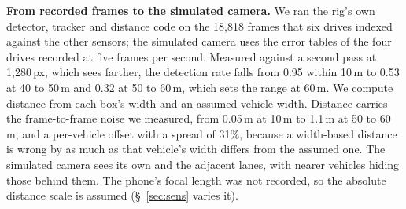 \noindent\textbf{From recorded frames to the simulated camera.} We ran the rig's own detector, tracker and distance code on the 18,818 frames that six drives indexed against the other sensors; the simulated camera uses the error tables of the four drives recorded at five frames per second. Measured against a second pass at 1,280\,px, which sees farther, the detection rate falls from 0.95 within 10\,m to 0.53 at 40 to 50\,m and 0.32 at 50 to 60\,m, which sets the range at 60\,m. We compute distance from each box's width and an assumed vehicle width. Distance carries the frame-to-frame noise we measured, from 0.05\,m at 10\,m to 1.1\,m at 50 to 60\,m, and a per-vehicle offset with a spread of 31\%, because a width-based distance is wrong by as much as that vehicle's width differs from the assumed one. The simulated camera sees its own and the adjacent lanes, with nearer vehicles hiding those behind them. The phone's focal length was not recorded, so the absolute distance scale is assumed (\S~\ref{sec:sens} varies it).
